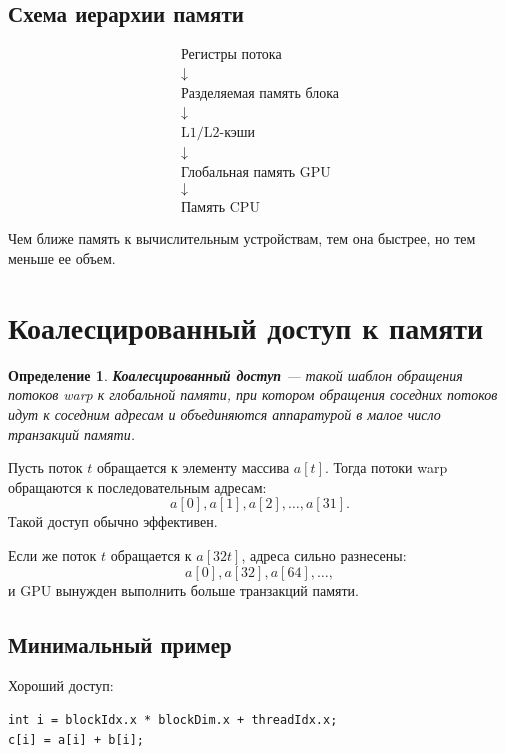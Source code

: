 \documentclass[12pt,a4paper]{article}
\newtheorem{definition}{Определение}
\begin{document}
\subsection{Схема иерархии памяти}

\[
\begin{array}{c}
\boxed{\text{Регистры потока}} \\
\downarrow \\
\boxed{\text{Разделяемая память блока}} \\
\downarrow \\
\boxed{\text{L1/L2-кэши}} \\
\downarrow \\
\boxed{\text{Глобальная память GPU}} \\
\downarrow \\
\boxed{\text{Память CPU}}
\end{array}
\]

Чем ближе память к вычислительным устройствам, тем она быстрее, но тем меньше ее объем.

\section{Коалесцированный доступ к памяти}

\begin{definition}
\textbf{Коалесцированный доступ} --- такой шаблон обращения потоков warp к глобальной памяти, при котором обращения соседних потоков идут к соседним адресам и объединяются аппаратурой в малое число транзакций памяти.
\end{definition}

Пусть поток $t$ обращается к элементу массива $a[t]$. Тогда потоки warp обращаются к последовательным адресам:
\[
    a[0], a[1], a[2], \dots, a[31].
\]
Такой доступ обычно эффективен.

Если же поток $t$ обращается к $a[32t]$, адреса сильно разнесены:
\[
    a[0], a[32], a[64], \dots,
\]
и GPU вынужден выполнить больше транзакций памяти.

\subsection{Минимальный пример}

Хороший доступ:

\begin{lstlisting}[style=cuda]
int i = blockIdx.x * blockDim.x + threadIdx.x;
c[i] = a[i] + b[i];
\end{lstlisting}
\end{document}
